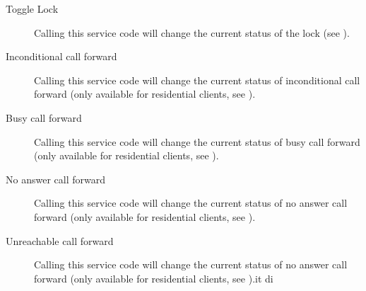 \documentclass[letterpaper,10pt,english]{sphinxmanual}
\begin{document}
\begin{description}
\item[{Toggle Lock}] \leavevmode{}\label{administration_portal/platform/services:term-toggle-lock}
Calling this service code will change the current status of the lock (see {\hyperref[administration_portal/client/vpbx/routing_tools/route_locks:route\string-locks]{}}).

\item[{Inconditional call forward}] \leavevmode{}\label{administration_portal/platform/services:term-inconditional-call-forward}
Calling this service code will change the current status of inconditional call forward (only available for
residential clients, see {\hyperref[administration_portal/client/residential/residential_devices:residential\string-devices\string-cfw]{}}).

\item[{Busy call forward}] \leavevmode{}\label{administration_portal/platform/services:term-busy-call-forward}
Calling this service code will change the current status of busy call forward (only available for
residential clients, see {\hyperref[administration_portal/client/residential/residential_devices:residential\string-devices\string-cfw]{}}).

\item[{No answer call forward}] \leavevmode{}\label{administration_portal/platform/services:term-no-answer-call-forward}
Calling this service code will change the current status of no answer call forward (only available for
residential clients, see {\hyperref[administration_portal/client/residential/residential_devices:residential\string-devices\string-cfw]{}}).

\item[{Unreachable call forward}] \leavevmode{}\label{administration_portal/platform/services:term-unreachable-call-forward}
Calling this service code will change the current status of no answer call forward (only available for
residential clients, see {\hyperref[administration_portal/client/residential/residential_devices:residential\string-devices\string-cfw]{}}).it di

\end{description}
\end{document}
